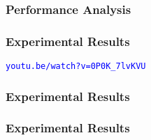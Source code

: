 \begin{frame}
    \frametitle{Performance Analysis}
    \begin{figure}[h]
        \centering
        
    \end{figure}
\end{frame}

\begin{frame}
    \frametitle{Experimental Results}
    \centering
    \textcolor{blue}{\texttt{youtu.be/watch?v=0P0K\_7lvKVU}}
\end{frame}

\begin{frame}
    \frametitle{Experimental Results}
    \begin{figure}[h]
        \hspace{-3mm}\centerline{}
    \end{figure}
\end{frame}

\begin{frame}
    \frametitle{Experimental Results}
    \begin{figure}[h]
        \centering
        \resizebox{0.85\textwidth}{!}{}
    \end{figure}
\end{frame}
